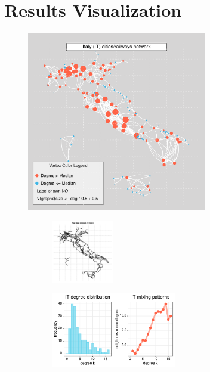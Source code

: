 \section{Results Visualization}
\begin{figure}[H]
\centering
    \includegraphics[width = 0.7\textwidth]{latex_source/images/railways/city_networks/IT_network.pdf}

\begin{subfigure}{}
    \includegraphics[width = 0.3\textwidth]{latex_source/images/railways/raw_networks/raw_IT_network.pdf}
\end{subfigure}
\begin{subfigure}{}
    \includegraphics[width = 0.6\textwidth]{latex_source/images/railways/city_network_analysis/IT_analysis.pdf}
\end{subfigure}
\caption{}
\end{figure}
\newpage
